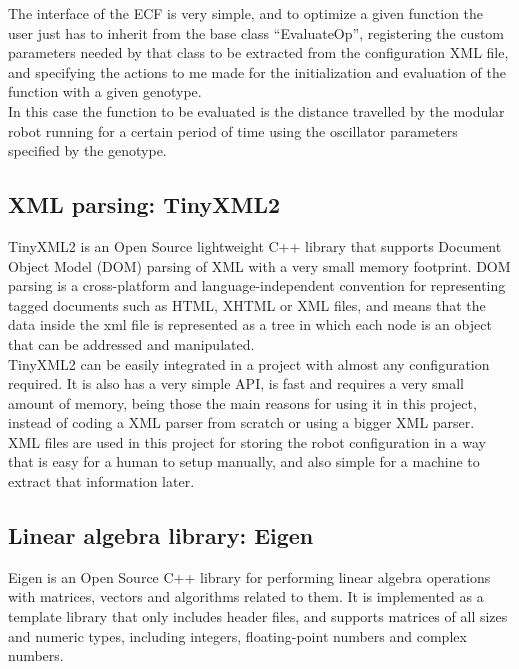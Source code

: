 The interface of the ECF is very simple, and to optimize a given function the user just has to inherit from the base class ``EvaluateOp'', registering the custom parameters needed by that class to be extracted from the configuration XML file, and specifying the actions to me made for the initialization and evaluation of the function with a given genotype.\\

In this case the function to be evaluated is the distance travelled by the modular robot running for a certain period of time using the oscillator parameters specified by the genotype.


\subsection{XML parsing: TinyXML2}
\label{software_tinyxml2}

TinyXML2 \cite{tinyxml2:website} is an Open Source lightweight C++ library that supports Document Object Model (DOM) parsing of XML with a very small memory footprint. DOM parsing is a cross-platform and language-independent convention for representing tagged documents such as HTML, XHTML or XML files, and means that the data inside the xml file is represented as a tree in which each node is an object that can be addressed and manipulated.\\

TinyXML2 can be easily integrated in a project with almost any configuration required. It is also has a very simple API, is fast and requires a very small amount of memory, being those the main reasons for using it in this project, instead of coding a XML parser from scratch or using a bigger XML parser.\\

XML files are used in this project for storing the robot configuration in a way that is easy for a human to setup manually, and also simple for a machine to extract that information later.\\



\subsection{Linear algebra library: Eigen}
\label{software_eigen}

Eigen \cite{eigen:website} is an Open Source C++ library for performing linear algebra operations with matrices, vectors and algorithms related to them. It is implemented as a template library that only includes header files, and supports matrices of all sizes and numeric types, including integers, floating-point numbers and complex numbers.\\

